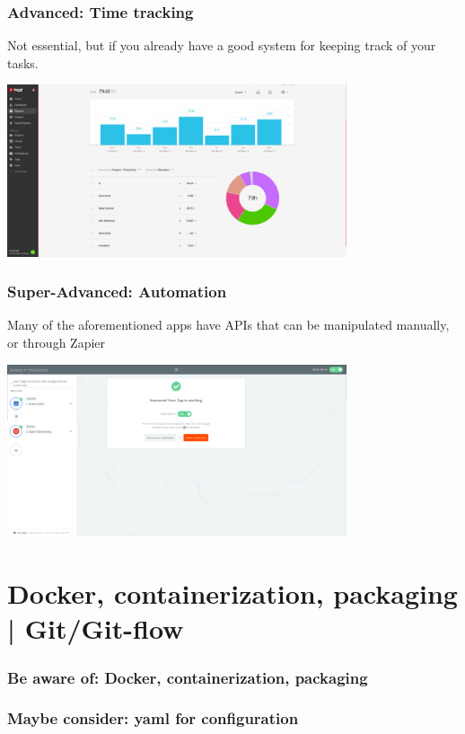\documentclass[10pt]{beamer}
\begin{document}
\begin{frame}[c]\frametitle{Advanced: Time tracking}

Not essential, but if you already have a good system for keeping track of your tasks.

\centerline{\includegraphics[width=10cm]{figs/toggl.png}}

\end{frame}

\begin{frame}[c]\frametitle{Super-Advanced: Automation}

Many of the aforementioned apps have APIs that can be manipulated manually, or through Zapier

\centerline{\includegraphics[width=10cm]{zapier.png}}

\end{frame}

\section{Docker, containerization, packaging | Git/Git-flow}

\begin{frame}[c]\frametitle{Be aware of: Docker, containerization, packaging}



\end{frame}

\begin{frame}[c]\frametitle{Maybe consider: yaml for configuration}



\end{frame}
\end{document}
